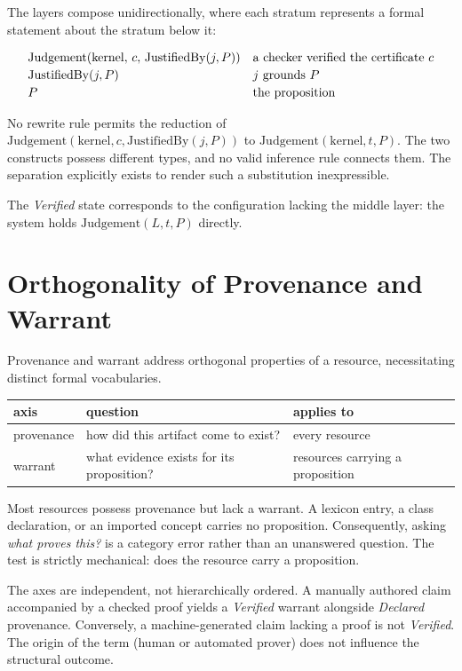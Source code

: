\documentclass[manuscript,nonacm=true]{acmart}
\begin{document}
The layers compose unidirectionally, where each stratum represents a formal statement about the stratum below it:

\[
\begin{array}{@{}ll@{}}
  \mathrm{Judgement}(\mathrm{kernel},\, c,\, \mathrm{JustifiedBy}(j, P))
    & \text{a checker verified the certificate } c \\[2pt]
  \mathrm{JustifiedBy}(j, P) & j \text{ grounds } P \\[2pt]
  P & \text{the proposition}
\end{array}
\]

No rewrite rule permits the reduction of $\mathrm{Judgement}(\mathrm{kernel}, c, \mathrm{JustifiedBy}(j,P))$ to $\mathrm{Judgement}(\mathrm{kernel}, t, P)$. The two constructs possess different types, and no valid inference rule connects them. The separation explicitly exists to render such a substitution inexpressible.

The \emph{Verified} state corresponds to the configuration lacking the middle layer: the system holds $\mathrm{Judgement}(L, t, P)$ directly.

\section{Orthogonality of Provenance and Warrant}

Provenance and warrant address orthogonal properties of a resource, necessitating distinct formal vocabularies.

\begin{table}[h]
\small
\begin{tabular}{@{}lll@{}}
\toprule
\textbf{axis} & \textbf{question} & \textbf{applies to} \\
\midrule
provenance & how did this artifact come to exist? & every resource \\
warrant & what evidence exists for its proposition? & resources carrying a proposition \\
\bottomrule
\end{tabular}
\end{table}

Most resources possess provenance but lack a warrant. A lexicon entry, a class declaration, or an imported concept carries no proposition. Consequently, asking \emph{what proves this?} is a category error rather than an unanswered question. The test is strictly mechanical: does the resource carry a proposition.

The axes are independent, not hierarchically ordered. A manually authored claim accompanied by a checked proof yields a \emph{Verified} warrant alongside \emph{Declared} provenance. Conversely, a machine-generated claim lacking a proof is not \emph{Verified}. The origin of the term (human or automated prover) does not influence the structural outcome.
\end{document}

